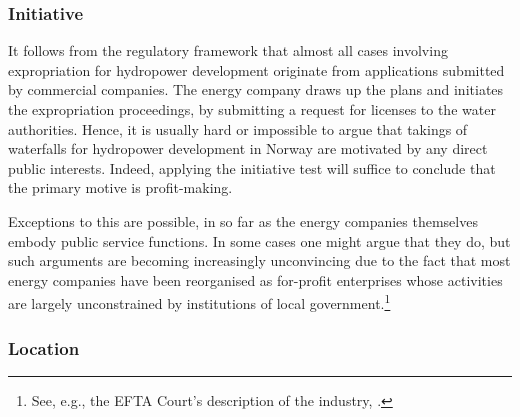 \subsubsection{Initiative}

It follows from the regulatory framework that almost all cases involving expropriation for hydropower development originate from applications submitted by commercial companies. The energy company draws up the plans and initiates the expropriation proceedings, by submitting a request for licenses to the water authorities. Hence, it is usually hard or impossible to argue that takings of waterfalls for hydropower development in Norway are motivated by any direct public interests. Indeed, applying the initiative test will suffice to conclude that the primary motive is profit-making. 

Exceptions to this are possible, in so far as the energy companies themselves embody public service functions. In some cases one might argue that they do, but such arguments are becoming increasingly unconvincing due to the fact that most energy companies have been reorganised as for-profit enterprises whose activities are largely unconstrained by institutions of local government.\footnote{See, e.g., the EFTA Court's description of the industry, \cite[]{efta06}.}



\subsubsection{Location}

